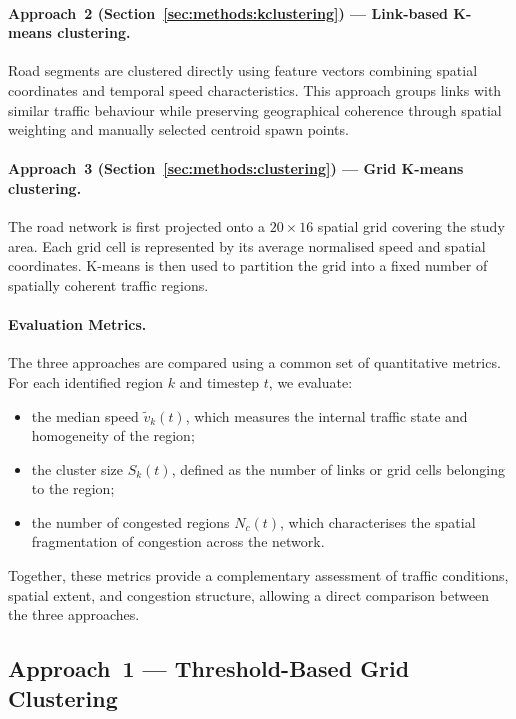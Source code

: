 \documentclass[11pt,a4paper]{article}
\begin{document}
\paragraph{Approach~2 (Section~\ref{sec:methods:kclustering}) --- Link-based
K-means clustering.}
Road segments are clustered directly using feature vectors combining spatial
coordinates and temporal speed characteristics. This approach groups links
with similar traffic behaviour while preserving geographical coherence through
spatial weighting and manually selected centroid spawn points.

\paragraph{Approach~3 (Section~\ref{sec:methods:clustering}) --- Grid
K-means clustering.}
The road network is first projected onto a $20 \times 16$ spatial grid
covering the study area. Each grid cell is represented by its average
normalised speed and spatial coordinates. K-means is then used to partition
the grid into a fixed number of spatially coherent traffic regions.

\paragraph{Evaluation Metrics.}
The three approaches are compared using a common set of quantitative metrics.
For each identified region $k$ and timestep $t$, we evaluate:

\begin{itemize}
    \item the median speed $\tilde{v}_k(t)$, which measures the internal
    traffic state and homogeneity of the region;
    \item the cluster size $S_k(t)$, defined as the number of links or grid
    cells belonging to the region;
    \item the number of congested regions $N_c(t)$, which characterises the
    spatial fragmentation of congestion across the network.
\end{itemize}

Together, these metrics provide a complementary assessment of traffic
conditions, spatial extent, and congestion structure, allowing a direct
comparison between the three approaches.

\subsection{Approach~1 --- Threshold-Based Grid Clustering}
\label{sec:methods:merge}
\end{document}
